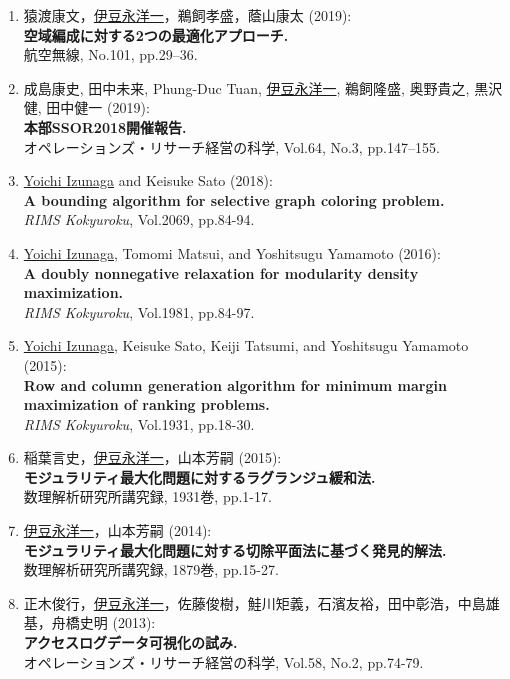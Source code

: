 \documentclass[dvipdfmx,9pt,a4paper]{article}
\begin{document}
\begin{enumerate}

\item 猿渡康文，\underline{伊豆永洋一}，鵜飼孝盛，蔭山康太 (2019):\\
{\bf 空域編成に対する2つの最適化アプローチ.}\\
{航空無線}, No.101, pp.29--36.

\item 成島康史, 田中未来, Phung-Duc Tuan, \underline{伊豆永洋一}, 鵜飼隆盛, 奥野貴之, 黒沢健, 田中健一 (2019):\\
{\bf 本部SSOR2018開催報告.}\\
{オペレーションズ・リサーチ経営の科学}, Vol.64, No.3, pp.147--155.

\item \underline{Yoichi Izunaga} and Keisuke Sato (2018):\\
{\bf A bounding algorithm for selective graph coloring problem.}\\
{\it RIMS Kokyuroku}, Vol.2069, pp.84-94.

\item \underline{Yoichi Izunaga}, Tomomi Matsui, and Yoshitsugu Yamamoto (2016):\\
{\bf A doubly nonnegative relaxation for modularity density maximization.}\\
{\it RIMS Kokyuroku}, Vol.1981, pp.84-97.

\item \underline{Yoichi Izunaga}, Keisuke Sato, Keiji Tatsumi, and Yoshitsugu Yamamoto (2015):\\
{\bf Row and column generation algorithm for minimum margin maximization of ranking problems.}\\
{\it RIMS Kokyuroku}, Vol.1931, pp.18-30.

\item 稲葉言史，\underline{伊豆永洋一}，山本芳嗣 (2015):\\
{\bf モジュラリティ最大化問題に対するラグランジュ緩和法.}\\
{数理解析研究所講究録}, 1931巻, pp.1-17.

\item \underline{伊豆永洋一}，山本芳嗣 (2014):\\
{\bf モジュラリティ最大化問題に対する切除平面法に基づく発見的解法.}\\
{数理解析研究所講究録}, 1879巻, pp.15-27.

\item 正木俊行，\underline{伊豆永洋一}，佐藤俊樹，鮭川矩義，石濱友裕，田中彰浩，中島雄基，舟橋史明 (2013):\\
{\bf アクセスログデータ可視化の試み.}\\
{オペレーションズ・リサーチ経営の科学}, Vol.58, No.2, pp.74-79.

\end{enumerate}
\end{document}
